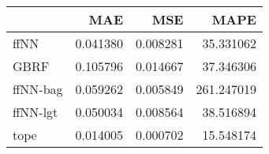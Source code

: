 \begin{tabular}{lrrr}
\toprule
{} &       MAE &       MSE &        MAPE \\
\midrule
ffNN     &  0.041380 &  0.008281 &   35.331062 \\
GBRF     &  0.105796 &  0.014667 &   37.346306 \\
ffNN-bag &  0.059262 &  0.005849 &  261.247019 \\
ffNN-lgt &  0.050034 &  0.008564 &   38.516894 \\
tope     &  0.014005 &  0.000702 &   15.548174 \\
\bottomrule
\end{tabular}
